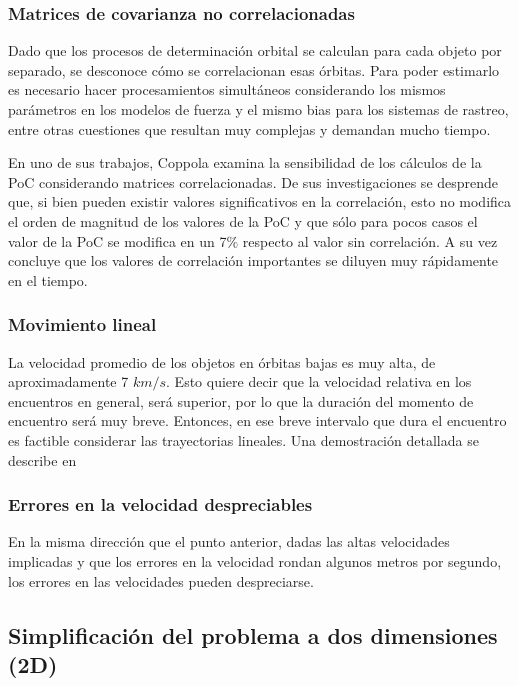 \subsubsection*{Matrices de covarianza no correlacionadas}
Dado que los procesos de determinaci\'on orbital se calculan para cada objeto por separado, se desconoce c\'omo se correlacionan esas \'orbitas. Para poder estimarlo es necesario hacer procesamientos simult\'aneos considerando los mismos par\'ametros en los modelos de fuerza y el mismo bias para los sistemas de rastreo, entre otras cuestiones que resultan muy complejas y demandan mucho tiempo.

En uno de sus trabajos, Coppola \citep{coppola2004effects} examina la sensibilidad de los c\'alculos de la PoC considerando matrices correlacionadas. De sus investigaciones se desprende que, si bien pueden existir valores significativos en la correlaci\'on, esto no modifica el orden de magnitud de los valores de la PoC y que s\'olo para pocos casos el valor de la PoC se modifica en un 7$\%$ respecto al valor sin correlaci\'on. A su vez concluye que los valores de correlaci\'on importantes se diluyen muy r\'apidamente en el tiempo.

\subsubsection*{Movimiento lineal}
La velocidad promedio de los objetos en \'orbitas bajas es muy alta, de aproximadamente 7 $km/s$. Esto quiere decir que la velocidad relativa en los encuentros en general, ser\'a superior, por lo que la duraci\'on del momento de encuentro ser\'a muy breve. Entonces, en ese breve intervalo que dura el encuentro es factible considerar las trayectorias lineales. Una demostraci\'on detallada se describe en \citep{arrufat2013study}

\subsubsection*{Errores en la velocidad despreciables}
En la misma direcci\'on que el punto anterior, dadas las altas velocidades implicadas y que los errores en la velocidad rondan algunos metros por segundo, los errores en las velocidades pueden despreciarse. 

\subsection{Simplificaci\'on del problema a dos dimensiones (2D)}

